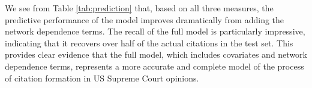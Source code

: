 \documentclass[headsepline=true, abstracton]{scrartcl}
\begin{document}
We see from Table \ref{tab:prediction} that, based on all three measures, the predictive performance of the model improves dramatically from adding the network dependence terms. The recall of the full model is particularly impressive, indicating that it recovers over half of the actual citations in the test set. This provides clear evidence that the full model, which includes covariates and network dependence terms, represents a more accurate and complete model of the process of citation formation in US Supreme Court opinions.


 

\end{document}
